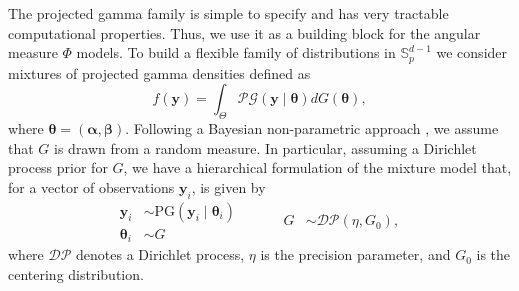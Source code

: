 \documentclass[iicol,sn-basic]{sn-jnl}
\theoremstyle{thmstyleone}
\begin{document}
The projected gamma family is simple to specify and has very tractable computational properties. Thus, we use it as a building block for the angular measure $\Phi$ models. To build a flexible family of distributions in ${\mathbb S}_p^{d-1}$ we consider mixtures of projected gamma densities defined as
\begin{equation} \label{eqn:PGmix}
f(\bm{y}) = \int_\Theta \mathcal{PG}(\bm{y}\mid \bm{\theta}) dG(\bm{\theta}),
\end{equation}
where $\bm{\theta} = (\bm{\alpha}, \bm{\beta})$. Following a Bayesian non-parametric approach \citep{Ferguson74,Antoniak1974}\hl{\mbox{\citep{muller2015}}}, we assume that $G$ is drawn from a random measure. In particular, assuming a Dirichlet process prior for $G$, we have a hierarchical formulation of the mixture model that, for a vector of observations $\bm{y}_i$, is given by
\begin{equation}\label{eqn:dppg}
\begin{aligned}
\bm{y}_i &\sim \text{PG}(\bm{y}_i\mid \bm{\theta}_i)\\
\bm{\theta}_i &\sim G
\end{aligned}
~\hspace{1cm}
\begin{aligned}
G &\sim \mathcal{DP}(\eta, G_0),
\end{aligned}
\end{equation}
where $\mathcal{DP}$ denotes a Dirichlet process, $\eta$ is the precision parameter, and $G_0$ is the centering distribution.
\end{document}
